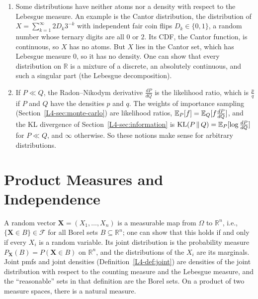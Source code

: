\begin{remark}\label{B-rem:singular}
    \begin{enumerate}
        \item Some distributions have neither atoms nor a density with respect to the Lebesgue measure. An example is the Cantor distribution, the distribution of $X = \sum_{k=1}^\infty 2D_k3^{-k}$ with independent fair coin flips $D_k \in \{0, 1\}$, a random number whose ternary digits are all $0$ or $2$. Its CDF, the Cantor function, is continuous, so $X$ has no atoms. But $X$ lies in the Cantor set, which has Lebesgue measure $0$, so it has no density. One can show that every distribution on $\mathbb{R}$ is a mixture of a discrete, an absolutely continuous, and such a singular part (the Lebesgue decomposition).
        \item If $P \ll Q$, the Radon--Nikodym derivative $\frac{dP}{dQ}$ is the likelihood ratio, which is $\frac{p}{q}$ if $P$ and $Q$ have the densities $p$ and $q$. The weights of importance sampling (Section~\ref{L4-sec:monte-carlo}) are likelihood ratios, $\mathbb{E}_P[f] = \mathbb{E}_Q[f\frac{dP}{dQ}]$, and the KL divergence of Section~\ref{L4-sec:information} is $\operatorname{KL}(P \,\|\, Q) = \mathbb{E}_P[\log\frac{dP}{dQ}]$ for $P \ll Q$, and $\infty$ otherwise. So these notions make sense for arbitrary distributions.
    \end{enumerate}
\end{remark}

\section{Product Measures and Independence}\label{B-sec:product}

A random vector $\mathbf{X} = (X_1, \ldots, X_n)$ is a measurable map from $\Omega$ to $\mathbb{R}^n$, i.e., $\{\mathbf{X} \in B\} \in \mathcal{F}$ for all Borel sets $B \subseteq \mathbb{R}^n$; one can show that this holds if and only if every $X_i$ is a random variable. Its joint distribution is the probability measure $P_{\mathbf{X}}(B) = P(\mathbf{X} \in B)$ on $\mathbb{R}^n$, and the distributions of the $X_i$ are its marginals. Joint pmfs and joint densities (Definition~\ref{L4-def:joint}) are densities of the joint distribution with respect to the counting measure and the Lebesgue measure, and the ``reasonable'' sets in that definition are the Borel sets. On a product of two measure spaces, there is a natural measure.

